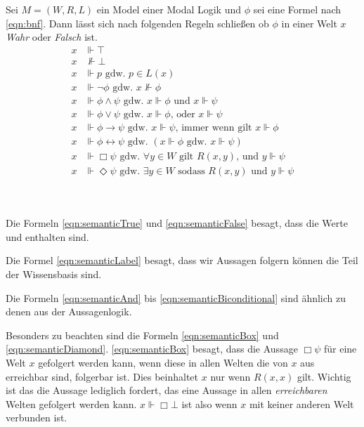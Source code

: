 \begin{definition}
	\label{def:reasoning}
	Sei $M = (W,R,L)$ ein Model einer Modal Logik und $\phi$ sei eine Formel nach \eqref{eqn:bnf}.
	Dann lässt sich nach folgenden Regeln schließen ob $\phi$ in einer Welt $x$ \emph{Wahr} oder \emph{Falsch} ist.
	\begin{align}
		x &\Vdash \top\label{eqn:semanticTrue}\\
		x &\nVdash \bot\label{eqn:semanticFalse}\\
		x &\Vdash p\text{ gdw. }p \in L(x)\label{eqn:semanticLabel}\\
		x &\Vdash \neg \phi\text{ gdw. }x \nVdash \phi\\
		x &\Vdash \phi \wedge \psi\text{ gdw. }x \Vdash \phi\text{ und } x \Vdash \psi\label{eqn:semanticAnd}\\
		x &\Vdash \phi \vee \psi\text{ gdw. }x \Vdash \phi \text{, oder } x \Vdash \psi\\
		x &\Vdash \phi \rightarrow \psi\text{ gdw. }x \Vdash \psi\text{, immer wenn gilt }x \Vdash \phi\\
		x &\Vdash \phi \leftrightarrow \psi\text{ gdw. }( x \Vdash \phi\text{ gdw. }x \Vdash \psi)\label{eqn:semanticBiconditional}\\
		x &\Vdash \Box \psi \text{ gdw. }\forall y \in W \text{ gilt } R(x,y)\text{, und } y \Vdash \psi\label{eqn:semanticBox}\\
		x &\Vdash \Diamond \psi\text{ gdw. }\exists y \in W \text{ sodass }R(x,y)\text{ und }y \Vdash \psi\label{eqn:semanticDiamond}
	\end{align}	
\end{definition}
\cite[S.310]{huth2004logic}\\
\\
%
%
Die Formeln \eqref{eqn:semanticTrue} und \eqref{eqn:semanticFalse} besagt, dass die Werte \true und \false enthalten sind. 

Die Formel \eqref{eqn:semanticLabel} besagt, dass wir Aussagen folgern können die Teil der Wissensbasis sind.

Die Formeln \eqref{eqn:semanticAnd} bis \eqref{eqn:semanticBiconditional} sind ähnlich zu denen aus der Aussagenlogik.

Besonders zu beachten sind die Formeln \eqref{eqn:semanticBox} und \eqref{eqn:semanticDiamond}. 
\eqref{eqn:semanticBox} besagt, dass die Aussage $\Box\psi$ für eine Welt $x$ gefolgert werden kann, wenn diese in allen Welten die von $x$ aus erreichbar sind, folgerbar ist. 
Dies beinhaltet $x$ nur wenn $R(x,x)$ gilt.
Wichtig ist das die Aussage lediglich fordert, das eine Aussage in allen \emph{erreichbaren} Welten gefolgert werden kann. $x \Vdash \Box \bot$ ist also \true wenn $x$ mit keiner anderen Welt verbunden ist.

